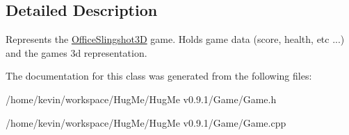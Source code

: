 \subsection{Detailed Description}
Represents the \hyperlink{classOfficeSlingshot3D}{OfficeSlingshot3D} game. Holds game data (score, health, etc ...) and the games 3d representation. 

The documentation for this class was generated from the following files:\begin{DoxyCompactItemize}
\item 
/home/kevin/workspace/HugMe/HugMe v0.9.1/Game/Game.h\item 
/home/kevin/workspace/HugMe/HugMe v0.9.1/Game/Game.cpp\end{DoxyCompactItemize}
